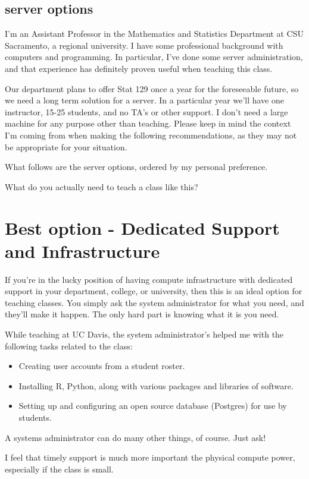 \documentclass{article}
\begin{document}
\subsection{server options}

I'm an Assistant Professor in the Mathematics and Statistics Department at CSU Sacramento, a regional university.
I have some professional background with computers and programming.
In particular, I've done some server administration, and that experience has definitely proven useful when teaching this class.

Our department plans to offer Stat 129 once a year for the foreseeable future, so we need a long term solution for a server.
In a particular year we'll have one instructor, 15-25 students, and no TA's or other support.
I don't need a large machine for any purpose other than teaching.
Please keep in mind the context I'm coming from when making the following recommendations, as they may not be appropriate for your situation.

What follows are the server options, ordered by my personal preference.

What do you actually need to teach a class like this?

\section{Best option - Dedicated Support and Infrastructure}

If you're in the lucky position of having compute infrastructure with dedicated support in your department, college, or university, then this is an ideal option for teaching classes.
You simply ask the system administrator for what you need, and they'll make it happen.
The only hard part is knowing what it is you need.

While teaching at UC Davis, the system administrator's helped me with the following tasks related to the class:
\begin{itemize}
\item Creating user accounts from a student roster.
\item Installing R, Python, along with various packages and libraries of software.
\item Setting up and configuring an open source database (Postgres) for use by students.
\end{itemize}

A systems administrator can do many other things, of course.
Just ask!

I feel that timely support is much more important the physical compute power, especially if the class is small.
\end{document}
